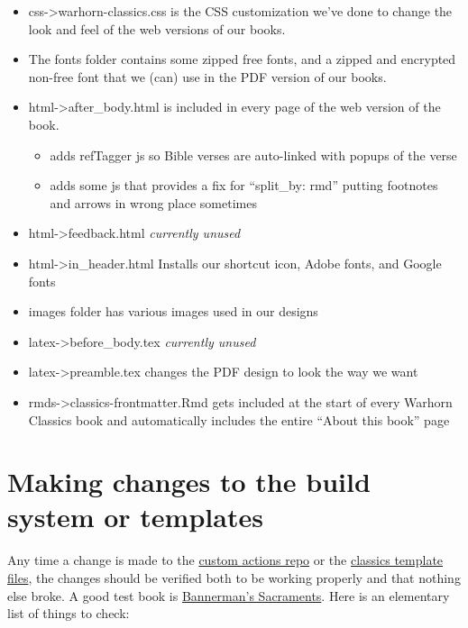 \documentclass[
]{book}
\providecommand{\tightlist}{%
  \setlength{\itemsep}{0pt}\setlength{\parskip}{0pt}}
\begin{document}
\begin{itemize}
\tightlist
\item
  css-\textgreater warhorn-classics.css is the CSS customization we've done to change the look and feel of the web versions of our books.
\item
  The fonts folder contains some zipped free fonts, and a zipped and encrypted non-free font that we (can) use in the PDF version of our books.
\item
  html-\textgreater after\_body.html is included in every page of the web version of the book.

  \begin{itemize}
  \tightlist
  \item
    adds refTagger js so Bible verses are auto-linked with popups of the verse
  \item
    adds some js that provides a fix for ``split\_by: rmd'' putting footnotes and arrows in wrong place sometimes
  \end{itemize}
\item
  html-\textgreater feedback.html \emph{currently unused}
\item
  html-\textgreater in\_header.html Installs our shortcut icon, Adobe fonts, and Google fonts
\item
  images folder has various images used in our designs
\item
  latex-\textgreater before\_body.tex \emph{currently unused}
\item
  latex-\textgreater preamble.tex changes the PDF design to look the way we want
\item
  rmds-\textgreater classics-frontmatter.Rmd gets included at the start of every Warhorn Classics book and automatically includes the entire ``About this book'' page
\end{itemize}

\hypertarget{making-changes-to-the-build-system-or-templates}{%
\section{Making changes to the build system or templates}\label{making-changes-to-the-build-system-or-templates}}

Any time a change is made to the \href{https://github.com/warhornmedia/custom-actions}{custom actions repo} or the \href{https://github.com/warhornmedia/classics-template-files}{classics template files}, the changes should be verified both to be working properly and that nothing else broke. A good test book is \href{https://github.com/warhornmedia/bannerman-sacraments}{Bannerman's Sacraments}. Here is an elementary list of things to check:
\end{document}
